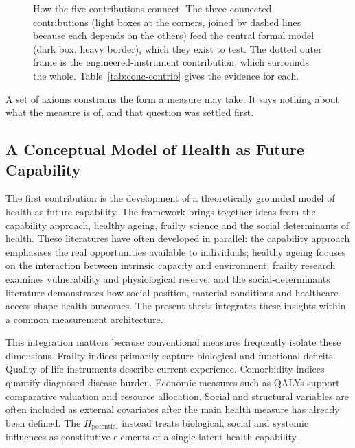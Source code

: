 \begin{figure}[htbp]
\centering

\captionsetup{justification=justified, width=\linewidth}
\caption{How the five contributions connect. The three connected contributions (light boxes at the corners, joined by dashed lines because each depends on the others) feed the central formal model (dark box, heavy border), which they exist to test. The dotted outer frame is the engineered-instrument contribution, which surrounds the whole. Table~\ref{tab:conc-contrib} gives the evidence for each.}
\label{fig:contribution_triangle}
\end{figure}

A set of axioms constrains the form a measure may take. It says nothing
about what the measure is of, and that question was settled first.

\subsection{A Conceptual Model of Health as Future Capability}

The first contribution is the development of a theoretically grounded model of health as future capability. The framework brings together ideas from the capability approach, healthy ageing, frailty science and the social determinants of health. These literatures have often developed in parallel: the capability approach emphasises the real opportunities available to individuals; healthy ageing focuses on the interaction between intrinsic capacity \citep{who_2015_ageing,cesari_2018} and environment; frailty research examines vulnerability and physiological reserve; and the social-determinants literature demonstrates how social position, material conditions and healthcare access shape health outcomes. The present thesis integrates these insights within a common measurement architecture.

This integration matters because conventional measures frequently isolate these dimensions. Frailty indices primarily capture biological and functional deficits. Quality-of-life instruments describe current experience. Comorbidity indices quantify diagnosed disease burden. Economic measures such as QALYs support comparative valuation and resource allocation. Social and structural variables are often included as external covariates after the main health measure has already been defined. The $H_{\text{potential}}$ instead treats biological, social and systemic influences as constitutive elements of a single latent health capability.

